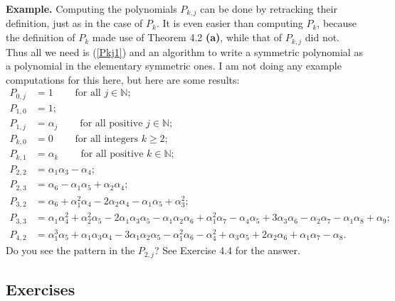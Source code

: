 \documentclass[numbers=enddot,12pt,final,onecolumn,notitlepage]{scrartcl}%
\begin{document}
\textbf{Example.} Computing the polynomials $P_{k,j}$ can be done by
retracking their definition, just as in the case of $P_{k}$. It is even easier
than computing $P_{k}$, because the definition of $P_{k}$ made use of Theorem
4.2 \textbf{(a)}, while that of $P_{k,j}$ did not. Thus all we need is
(\ref{Pkj1}) and an algorithm to write a symmetric polynomial as a polynomial
in the elementary symmetric ones. I am not doing any example computations for
this here, but here are some results:%
\begin{align*}
P_{0,j}  &  =1\ \ \ \ \ \ \ \ \ \ \text{for all }j\in\mathbb{N}\text{;}\\
P_{1,0}  &  =1;\\
P_{1,j}  &  =\alpha_{j}\ \ \ \ \ \ \ \ \ \ \text{for all positive }%
j\in\mathbb{N}\text{;}\\
P_{k,0}  &  =0\ \ \ \ \ \ \ \ \ \ \text{for all integers }k\geq2\text{;}\\
P_{k,1}  &  =\alpha_{k}\ \ \ \ \ \ \ \ \ \ \text{for all positive }%
k\in\mathbb{N}\text{;}\\
P_{2,2}  &  =\alpha_{1}\alpha_{3}-\alpha_{4};\\
P_{2,3}  &  =\alpha_{6}-\alpha_{1}\alpha_{5}+\alpha_{2}\alpha_{4};\\
P_{3,2}  &  =\alpha_{6}+\alpha_{1}^{2}\alpha_{4}-2\alpha_{2}\alpha_{4}%
-\alpha_{1}\alpha_{5}+\alpha_{3}^{2};\\
P_{3,3}  &  =\alpha_{1}\alpha_{4}^{2}+\alpha_{2}^{2}\alpha_{5}-2\alpha
_{1}\alpha_{3}\alpha_{5}-\alpha_{1}\alpha_{2}\alpha_{6}+\alpha_{1}^{2}%
\alpha_{7}-\alpha_{4}\alpha_{5}+3\alpha_{3}\alpha_{6}-\alpha_{2}\alpha
_{7}-\alpha_{1}\alpha_{8}+\alpha_{9};\\
P_{4,2}  &  =\alpha_{1}^{3}\alpha_{5}+\alpha_{1}\alpha_{3}\alpha_{4}%
-3\alpha_{1}\alpha_{2}\alpha_{5}-\alpha_{1}^{2}\alpha_{6}-\alpha_{4}%
^{2}+\alpha_{3}\alpha_{5}+2\alpha_{2}\alpha_{6}+\alpha_{1}\alpha_{7}%
-\alpha_{8}.
\end{align*}
Do you see the pattern in the $P_{2,j}$? See Exercise 4.4 for the answer.

\subsection{Exercises}
\end{document}
